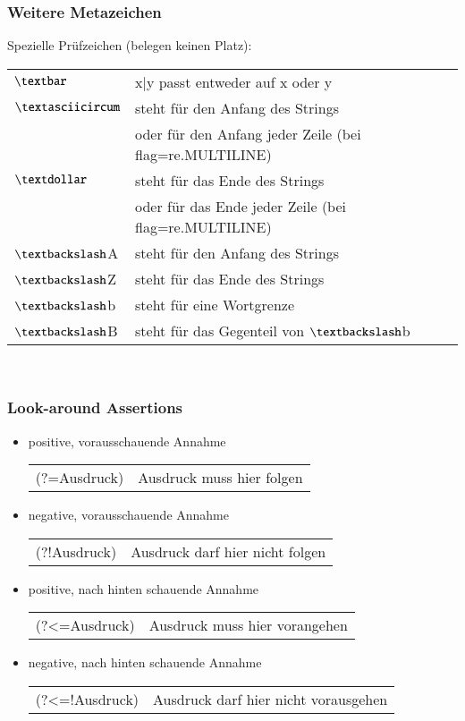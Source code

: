 \subsubsection{Weitere Metazeichen}
Spezielle Prüfzeichen (belegen keinen Platz):\\
\begin{tabular}{ll}
	$\textbar$& x|y passt entweder auf x oder y\\
	$\textasciicircum$& steht für den Anfang des Strings\\
	& oder für den Anfang jeder Zeile (bei flag=re.MULTILINE)\\
	$\textdollar$& steht für das Ende des Strings\\
	& oder für das Ende jeder Zeile (bei flag=re.MULTILINE)\\
	$\textbackslash$A& steht für den Anfang des Strings\\
	$\textbackslash$Z& steht für das Ende des Strings\\
	$\textbackslash$b& steht für eine Wortgrenze\\
	$\textbackslash$B& steht für das Gegenteil von $\textbackslash$b\\
\end{tabular}\\




\subsubsection{Look-around Assertions}
\begin{itemize}
	\item positive, vorausschauende Annahme\\
	\begin{tabular}{ll}
		(?=Ausdruck)& Ausdruck muss hier folgen\\
	\end{tabular}
	\item negative, vorausschauende Annahme\\
	\begin{tabular}{ll}
		(?!Ausdruck)& Ausdruck darf hier nicht folgen\\
	\end{tabular}
	\item positive, nach hinten schauende Annahme\\
	\begin{tabular}{ll}
		(?<=Ausdruck)& Ausdruck muss hier vorangehen\\
	\end{tabular}
	\item negative, nach hinten schauende Annahme\\
	\begin{tabular}{ll}
		(?<=!Ausdruck)& Ausdruck darf hier nicht vorausgehen\\
	\end{tabular}
\end{itemize}


